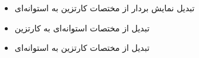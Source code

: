 \begin{ELjoin}

\begin{itemize}
\tightlist
\item
  تبدیل نمایش بردار از مختصات کارتزین به استوانه‌ای
\end{itemize}

\begin{ELimportant}{}


\end{ELimportant}

\end{ELjoin}

\begin{ELunit}

\begin{itemize}
\tightlist
\item
  تبدیل از مختصات استوانه‌ای به کارتزین
\end{itemize}


\begin{itemize}
\tightlist
\item
  تبدیل از مختصات کارتزین به استوانه‌ای
\end{itemize}



\end{ELunit}

\ELhold


